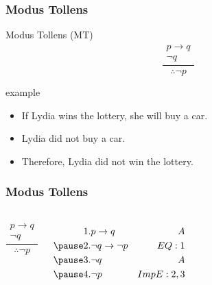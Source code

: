 \documentclass[dvipsnames]{beamer}
\begin{document}
\begin{frame}
  \frametitle{Modus Tollens}

  \begin{block}{Modus Tollens (MT)}
    \[
    \frac
      {
        \begin{array}{c}
          p \rightarrow q\\
          \neg q
        \end{array}
      }
      {
        \therefore \neg p
      }
    \]
  \end{block}

  \pause
  \begin{exampleblock}{example}
    \begin{itemize}
      \item If Lydia wins the lottery, she will buy a car.
      \item Lydia did not buy a car.

      \medskip
      \item Therefore, Lydia did not win the lottery.
    \end{itemize}
  \end{exampleblock}
\end{frame}

\begin{frame}
  \frametitle{Modus Tollens}

  \begin{columns}
    \[
    \frac
      {
        \begin{array}{c}
          p \rightarrow q\\
          \neg q
        \end{array}
      }
      {
        \therefore \neg p
      }
    \]

    \pause
    \begin{eqnarray*}
      1. & p \rightarrow q           & A\\
      \pause
      2. & \neg q \rightarrow \neg p & EQ: 1\\
      \pause
      3. & \neg q                    & A\\
      \pause
      4. & \neg p                    & ImpE:2,3\\
    \end{eqnarray*}
  \end{columns}
\end{frame}
\end{document}
